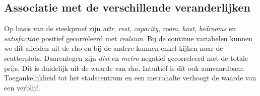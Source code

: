 \documentclass[a4paper]{kulakarticle}
\begin{document}
	\subsection{Associatie met de verschillende veranderlijken}
	
	Op basis van de steekproef zijn \textit{attr}, \textit{rest}, \textit{capacity}, \textit{room}, \textit{host}, \textit{bedrooms} en \textit{satisfaction} positief gecorreleerd met \textit{realsum}. Bij de continue variabelen kunnen we dit afleiden uit de rho en bij de andere kunnen enkel kijken naar de scatterplots. Daarentegen zijn \textit{dist} en \textit{metro} negatief gecorreleerd met de totale prijs. Dit is duidelijk uit de waarde van rho. Intuïtief is dit ook aanvaardbaar. Toegankelijkheid tot het stadscentrum en een metrohalte verhoogt de waarde van een verblijf.
\end{document}
